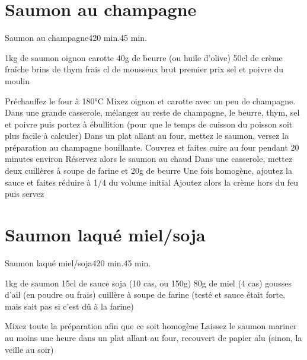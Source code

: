 {\section{Saumon au champagne}
\begin{recette}{Saumon au champagne}{4}{20 min.}{45 min.}
\begin{ingredients}
\ingredient 1kg de saumon
 oignon
 carotte
\ingredient 40g de beurre (ou huile d'olive)
\ingredient 50cl de crème fraîche
 brins de thym frais
 cl de mousseux brut premier prix
\ingredient sel et poivre du moulin 
\end{ingredients}

\begin{preparation}
\etape Préchauffez le four à 180°C
\etape Mixez oignon et carotte avec un peu de champagne.
\etape Dans une grande casserole, mélangez au reste de champagne, le beurre, thym, sel et poivre puis portez à ébullition (pour que le temps de cuisson du poisson soit plus facile à calculer)
\etape Dans un plat allant au four, mettez le saumon, versez la préparation au champagne bouillante. 
\etape Couvrez et faites cuire au four pendant 20 minutes environ
\etape Réservez alors le saumon au chaud
\etape Dans une casserole, mettez deux cuillères à soupe de farine et 20g de beurre
\etape Une fois homogène, ajoutez la sauce et faites réduire à 1/4 du volume initial
\etape Ajoutez alors la crème hors du feu puis servez
\end{preparation}
\end{recette}

\section{Saumon laqué miel/soja}
\begin{recette}{Saumon laqué miel/soja}{4}{20 min.}{45 min.}
\begin{ingredients}
\ingredient 1kg de saumon
\ingredient 15cl de sauce soja (10 cas, ou 150g)
\ingredient 80g de miel (4 cas)
 gousses d'ail (en poudre ou frais)
 cuillère à soupe de farine (testé et sauce était forte, mais sait pas si c'est dû à la farine)
\end{ingredients}

\begin{preparation}
\etape Mixez toute la préparation afin que ce soit homogène
\etape Laissez le saumon mariner au moins une heure dans un plat allant au four, recouvert de papier alu (sinon, la veille au soir)
\end{preparation}


\end{recette}}
